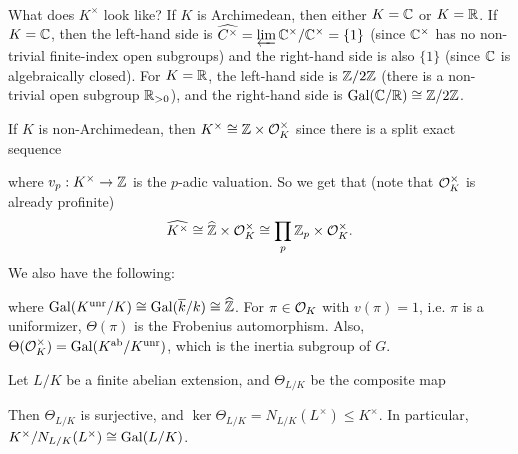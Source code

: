 \begin{remark}
  What does $\widehat{K^\times}$ look like?
  If $K$ is Archimedean, then either $K = \mathbb{C}$
  or $K = \mathbb{R}$. If $K = \mathbb{C}$, then
  the left-hand side is $\widehat{C^\times} = \varprojlim \mathbb{C}^\times / \mathbb{C}^\times = \{1\}$
  (since $\mathbb{C}^\times$ has no non-trivial
  finite-index open subgroups)
  and the right-hand side is also $\{1\}$
  (since $\mathbb{C}$ is algebraically closed).
  For $K = \mathbb{R}$, the left-hand side is
  $\mathbb{Z} / 2\mathbb{Z}$ (there is a non-trivial
  open subgroup $\mathbb{R}_{> 0}$), and the
  right-hand side is $\operatorname{Gal}(\mathbb{C} / \mathbb{R}) \cong \mathbb{Z} / 2\mathbb{Z}$.

  If $K$ is non-Archimedean, then
  $K^\times \cong \mathbb{Z} \times \mathcal{O}_K^\times$ since
  there is a split exact sequence
  \begin{center}
  \end{center}
  where $v_p : K^\times \to \mathbb{Z}$ is the
  $p$-adic valuation. So we get that
  (note that $\mathcal{O}_K^\times$ is already profinite)
  \[
    \widehat{K^\times} \cong \widehat{\mathbb{Z}} \times \mathcal{O}_K^\times
    \cong \prod_{p} \mathbb{Z}_p \times \mathcal{O}_K^\times.
  \]
  We also have the following:
  \begin{center}
  \end{center}
  where $\operatorname{Gal}(K^\mathrm{unr} / K) \cong \operatorname{Gal}(\overline{k} / k) \cong \widehat{\mathbb{Z}}$.
  For $\pi \in \mathcal{O}_K$ with
  $v(\pi) = 1$, i.e. $\pi$ is a uniformizer,
  $\Theta(\pi)$ is
  the Frobenius automorphism.
  Also,
  $\Theta(\mathcal{O}_K^\times) = \operatorname{Gal}(K^\mathrm{ab} / K^\mathrm{unr})$,
  which is the inertia subgroup of $G$.
\end{remark}

\begin{theorem}
  Let $L / K$ be a finite abelian extension, and
  $\Theta_{L / K}$ be the composite map
  \begin{center}
  \end{center}
  Then $\Theta_{L / K}$ is surjective, and
  $\ker \Theta_{L / K} = N_{L / K}(L^\times) \le K^\times$.
  In particular, $K^\times / N_{L / K}(L^\times) \cong \operatorname{Gal}(L / K)$.
\end{theorem}

